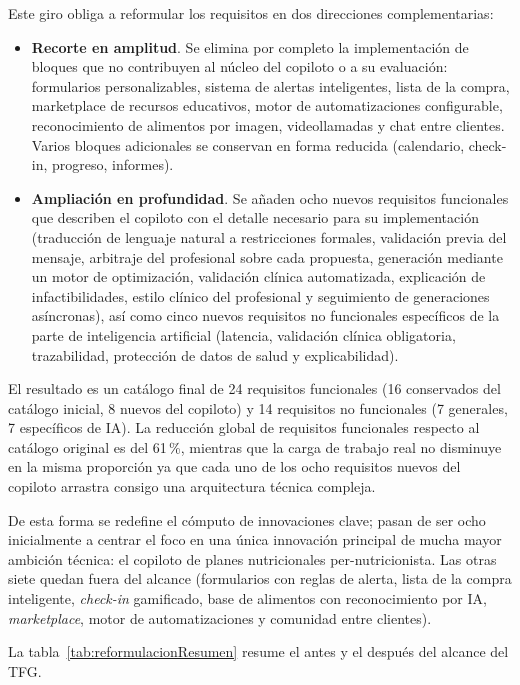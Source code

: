 Este giro obliga a reformular los requisitos en dos direcciones complementarias:

\begin{itemize}
    \item \textbf{Recorte en amplitud}. Se elimina por completo la implementación de bloques que no contribuyen al núcleo del copiloto o a su evaluación: formularios personalizables, sistema de alertas inteligentes, lista de la compra, marketplace de recursos educativos, motor de automatizaciones configurable, reconocimiento de alimentos por imagen, videollamadas y chat entre clientes. Varios bloques adicionales se conservan en forma reducida (calendario, check-in, progreso, informes).
    \item \textbf{Ampliación en profundidad}. Se añaden ocho nuevos requisitos funcionales que describen el copiloto con el detalle necesario para su implementación (traducción de lenguaje natural a restricciones formales, validación previa del mensaje, arbitraje del profesional sobre cada propuesta, generación mediante un motor de optimización, validación clínica automatizada, explicación de infactibilidades, estilo clínico del profesional y seguimiento de generaciones asíncronas), así como cinco nuevos requisitos no funcionales específicos de la parte de inteligencia artificial (latencia, validación clínica obligatoria, trazabilidad, protección de datos de salud y explicabilidad).
\end{itemize}

El resultado es un catálogo final de 24 requisitos funcionales (16 conservados del catálogo inicial, 8 nuevos del copiloto) y 14 requisitos no funcionales (7 generales, 7 específicos de IA). La reducción global de requisitos funcionales respecto al catálogo original es del 61\,\%, mientras que la carga de trabajo real no disminuye en la misma proporción ya que cada uno de los ocho requisitos nuevos del copiloto arrastra consigo una arquitectura técnica compleja.

De esta forma se redefine el cómputo de innovaciones clave; pasan de ser ocho inicialmente a centrar el foco en una única innovación principal de mucha mayor ambición técnica: el copiloto de planes nutricionales per-nutricionista. Las otras siete quedan fuera del alcance (formularios con reglas de alerta, lista de la compra inteligente, \textit{check-in} gamificado, base de alimentos con reconocimiento por IA, \textit{marketplace}, motor de automatizaciones y comunidad entre clientes).

La tabla~\ref{tab:reformulacionResumen} resume el antes y el después del alcance del TFG.

